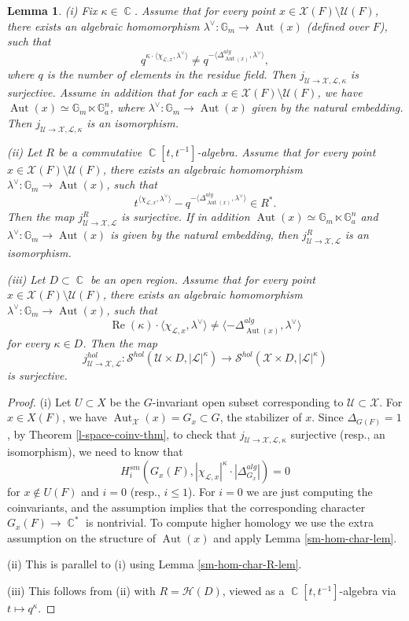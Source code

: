\documentclass[12pt,reqno]{amsart}
\DeclareMathOperator\C{\mathbb C}
\newtheorem{lemma}[theorem]{Lemma}
\theoremstyle{definition}
\theoremstyle{remark}
\numberwithin{equation}{section}
\newcommand{\De}{\Delta}
\newcommand{\Aut}{\operatorname{Aut}}
\renewcommand{\SS}{{\mathcal S}}
\newcommand{\HH}{{\mathcal H}}
\newcommand{\LL}{{\mathcal L}}
\newcommand{\UU}{{\mathcal U}}
\newcommand{\sub}{\subset}
\newcommand{\la}{\lambda}
\newcommand{\G}{{\mathbb G}}
\newcommand{\lan}{\langle}
\newcommand{\ran}{\rangle}
\newcommand{\XX}{{\mathcal X}}
\begin{document}
\begin{lemma}\label{surjective-lem-nonarch}
(i) Fix $\kappa\in\C$.
Assume that for every point $x\in \XX(F)\setminus \UU(F)$, 
there exists an algebraic homomorphism $\la^\vee:\G_m\to \Aut(x)$ (defined over $F$), such that
$$q^{\kappa\cdot \lan \chi_{\LL,x},\la^\vee\ran}\neq q^{-\lan\De^{alg}_{\Aut(x)},\la^\vee\ran},$$
where $q$ is the number of elements in the residue field. Then
$j_{\UU\to \XX,\LL,\kappa}$ is surjective. Assume in addition that for each $x\in \XX(F)\setminus \UU(F)$,
we have $\Aut(x)\simeq \G_m\ltimes \G_a^n$, where $\la^\vee:\G_m\to \Aut(x)$ given by the natural embedding. 
Then $j_{\UU\to \XX,\LL,\kappa}$ is an isomorphism.

\noindent
(ii) Let $R$ be a commutative $\C[t,t^{-1}]$-algebra. Assume that for every point  $x\in \XX(F)\setminus \UU(F)$, 
there exists an algebraic homomorphism $\la^\vee:\G_m\to \Aut(x)$, such that
$$t^{\lan \chi_{\LL,x},\la^\vee\ran}-q^{-\lan\De^{alg}_{\Aut(x)},\la^\vee\ran}\in R^*.$$
Then the map $j^R_{\UU\to \XX,\LL}$ is surjective. If in addition $\Aut(x)\simeq \G_m\ltimes \G_a^n$ and $\la^\vee:\G_m\to \Aut(x)$ is given by the natural embedding,
then  $j^R_{\UU\to \XX,\LL}$ is an isomorphism.

\noindent
(iii) Let $D\sub \C$ be an open region. Assume that for every point  $x\in \XX(F)\setminus \UU(F)$, 
there exists an algebraic homomorphism $\la^\vee:\G_m\to \Aut(x)$, such that
$$\operatorname{Re}(\kappa)\cdot \lan\chi_{\LL,x},\la^\vee\ran\neq \lan-\De^{alg}_{\Aut(x)},\la^\vee\ran$$
for every $\kappa\in D$. Then the map
$$j^{hol}_{\UU\to \XX,\LL}:\SS^{hol}(\UU\times D,|\LL|^{\kappa})\to\SS^{hol}(\XX\times D,|\LL|^{\kappa})$$
is surjective.
\end{lemma}

\begin{proof}
(i) Let $U\sub X$ be the $G$-invariant open subset corresponding to $\UU\sub\XX$. For $x\in X(F)$, we have $\Aut_{\XX}(x)=G_x\sub G$, the stabilizer of $x$.
Since $\De_{G(F)}=1$, by Theorem \ref{l-space-coinv-thm}, to check that $j_{\UU\to \XX,\LL,\kappa}$ surjective (resp., an isomorphism), we need to know that
$$H_i^{sm}(G_x(F),|\chi_{\LL,x}|^{\kappa}\cdot |\De^{alg}_{G_x}|)=0$$
for $x\not\in U(F)$ and $i=0$ (resp., $i\le 1$).
For $i=0$ we are just computing the coinvariants, and the assumption implies that the corresponding character $G_x(F)\to \C^*$ is nontrivial.
To compute higher homology we use the extra assumption on the structure of $\Aut(x)$ and apply Lemma \ref{sm-hom-char-lem}.

\noindent
(ii) This is parallel to (i) using Lemma \ref{sm-hom-char-R-lem}.

\noindent
(iii) This follows from (ii) with $R=\HH(D)$, viewed as a $\C[t,t^{-1}]$-algebra via $t\mapsto q^{\kappa}$.
\end{proof}
\end{document}
